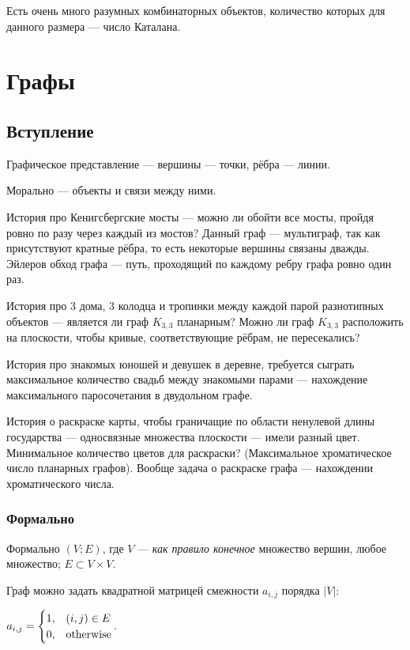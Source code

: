 \documentclass[a4paper]{report}
\begin{document}
    Есть очень много разумных комбинаторных объектов, количество которых для данного размера --- число Каталана.


    \chapter{Графы}


    \section{Вступление}
    Графическое представление --- вершины --- точки, рёбра --- линии.

    Морально --- объекты и связи между ними.

    История про Кенигсбергские мосты --- можно ли обойти все мосты, пройдя ровно по разу через каждый из мостов?  Данный граф --- мультиграф, так как присутствуют кратные рёбра, то есть некоторые вершины связаны дважды.
    Эйлеров обход графа --- путь, проходящий по каждому ребру графа ровно один раз.

    История про 3 дома, 3 колодца и тропинки между каждой парой разнотипных объектов --- является ли граф $K_{3,3}$ планарным?
    Можно ли граф $K_{3,3}$ расположить на плоскости, чтобы кривые, соответствующие рёбрам, не пересекались?

    История про знакомых юношей и девушек в деревне, требуется сыграть максимальное количество свадьб между знакомыми парами --- нахождение максимального паросочетания в двудольном графе.

    История о раскраске карты, чтобы граничащие по области ненулевой длины государства --- односвязные множества плоскости --- имели разный цвет.
    Минимальное количество цветов для раскраски? (Максимальное хроматическое число планарных графов).
    Вообще задача о раскраске графа --- нахождении хроматического числа.

    \subsection{Формально}
    Формально $(V; E)$, где $V$ --- \textit{как правило конечное} множество вершин, любое множество; $E \subset V \times V$.

    Граф можно задать квадратной матрицей смежности $a_{i,j}$ порядка $|V|$:

    $a_{i,j}=\begin{cases}1,&(i,j)\in E\\0, &\text{otherwise}\end{cases}$.
\end{document}
